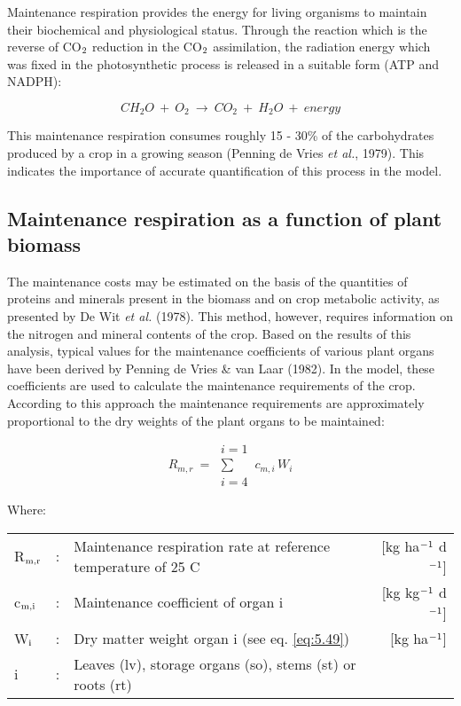 Maintenance respiration provides the energy for living organisms to maintain their
biochemical and physiological status. Through the reaction which is the reverse of CO$_{{\rm 2}}$
reduction in the CO$_{{\rm 2}}$ assimilation, the radiation energy which was fixed in the
photosynthetic process is released in a suitable form (ATP and NADPH):

\begin{equation}
CH _{2} O ~+~ O _{2} ~\longrightarrow~ CO _{2} ~+~ H _{2} O ~+~ energy
\end{equation}

This maintenance respiration consumes roughly 15 - 30\% of the carbohydrates produced
by a crop in a growing season (Penning de Vries {\it et al.}, 1979). This indicates the
importance of accurate quantification of this process in the model.

\subsection{Maintenance respiration as a function of plant biomass}
The maintenance costs may be estimated on the basis of the quantities of proteins and minerals present in the biomass and on crop metabolic activity, as presented by De Wit {\it et 	al.} (1978). This method, however, requires information on the nitrogen and mineral contents of the crop. Based on the results of this analysis, typical values for the maintenance coefficients of various plant organs have been derived by Penning de Vries \& van Laar (1982). In the model, these coefficients are used to calculate the maintenance requirements of the crop. According to this approach the maintenance requirements are approximately proportional to the dry weights of the plant organs to be maintained: 

\begin{equation}
\label{eq:5.39}
R _{m,r} ~ = ~\begin{array}{c} {i=1}  \\
\sum  \\
{i=4}\end{array} \, c _{m,i} \, W _{i}
\end{equation}

Where:\\[5pt]
\begin{tabularx}{\textwidth}{llXr}
	R$_{{\rm m,r}}$ &:& Maintenance respiration rate at reference 
	temperature of 25 \textdegree C &   [kg ha$^{{\rm -1}}$ d$^{{\rm -1}}$]\\
	c$_{{\rm m,i}}$ &:& Maintenance coefficient of organ i  & [kg kg$^{{\rm -1}}$ d$^{{\rm -1}}$]\\
	W$_{{\rm i}}$ &:& Dry matter weight organ i (see eq. \ref{eq:5.49})   &     [kg ha$^{{\rm -1}}$]\\
	i &:& Leaves (lv), storage organs (so), stems (st) or roots (rt)\\ 
\end{tabularx}

